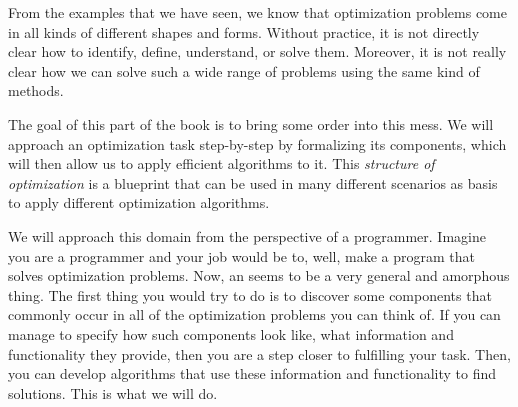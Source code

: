 %
\label{sec:structure:intro}%
%
From the examples that we have seen, we know that optimization problems come in all kinds of different shapes and forms.
Without practice, it is not directly clear how to identify, define, understand, or solve them.
Moreover, it is not really clear how we can solve such a wide range of problems using the same kind of methods.

The goal of this part of the book is to bring some order into this mess.
We will approach an optimization task step-by-step by formalizing its components, which will then allow us to apply efficient algorithms to it.
This \emph{structure of optimization} is a blueprint that can be used in many different scenarios as basis to apply different optimization algorithms.

We will approach this domain from the perspective of a programmer.
Imagine you are a programmer and your job would be to, well, make a program that solves optimization problems.
Now, an  seems to be a very general and amorphous thing.
The first thing you would try to do is to discover some components that commonly occur in all of the optimization problems you can think of.
If you can manage to specify how such components look like, what information and functionality they provide, then you are a step closer to fulfilling your task.
Then, you can develop algorithms that use these information and functionality to find solutions.
This is what we will do.

